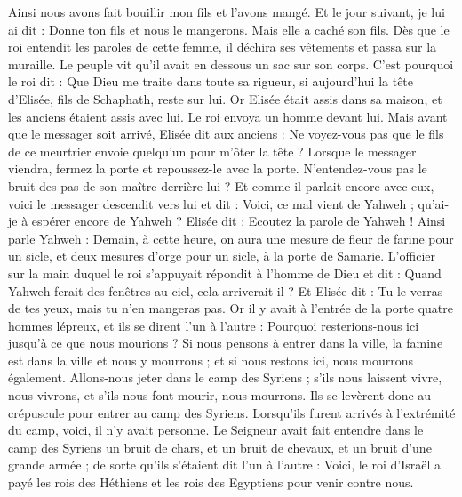 \begin{multicols}{2}
Ainsi nous avons fait bouillir mon fils et l'avons mangé. Et le jour suivant, je lui ai dit : Donne ton fils et nous le mangerons. Mais elle a caché son fils.
Dès que le roi entendit les paroles de cette femme, il déchira ses vêtements et passa sur la muraille. Le peuple vit qu'il avait en dessous un sac sur son corps.
C'est pourquoi le roi dit : Que Dieu me traite dans toute sa rigueur, si aujourd'hui la tête d'Elisée, fils de Schaphath, reste sur lui.
Or Elisée était assis dans sa maison, et les anciens étaient assis avec lui. Le roi envoya un homme devant lui. Mais avant que le messager soit arrivé, Elisée dit aux anciens : Ne voyez-vous pas que le fils de ce meurtrier envoie quelqu'un pour m'ôter la tête ? Lorsque le messager viendra, fermez la porte et repoussez-le avec la porte. N'entendez-vous pas le bruit des pas de son maître derrière lui ?
Et comme il parlait encore avec eux, voici le messager descendit vers lui et dit : Voici, ce mal vient de Yahweh ; qu'ai-je à espérer encore de Yahweh ?
\VerseOne{}Elisée dit : Ecoutez la parole de Yahweh ! Ainsi parle Yahweh : Demain, à cette heure, on aura une mesure de fleur de farine pour un sicle, et deux mesures d'orge pour un sicle, à la porte de Samarie.
L'officier sur la main duquel le roi s'appuyait répondit à l'homme de Dieu et dit : Quand Yahweh ferait des fenêtres au ciel, cela arriverait-il ? Et Elisée dit : Tu le verras de tes yeux, mais tu n'en mangeras pas.
Or il y avait à l'entrée de la porte quatre hommes lépreux, et ils se dirent l'un à l'autre : Pourquoi resterions-nous ici jusqu'à ce que nous mourions ?
Si nous pensons à entrer dans la ville, la famine est dans la ville et nous y mourrons ; et si nous restons ici, nous mourrons également. Allons-nous jeter dans le camp des Syriens ; s'ils nous laissent vivre, nous vivrons, et s'ils nous font mourir, nous mourrons.
Ils se levèrent donc au crépuscule pour entrer au camp des Syriens. Lorsqu'ils furent arrivés à l'extrémité du camp, voici, il n'y avait personne.
Le Seigneur avait fait entendre dans le camp des Syriens un bruit de chars, et un bruit de chevaux, et un bruit d'une grande armée ; de sorte qu'ils s'étaient dit l'un à l'autre : Voici, le roi d'Israël a payé les rois des Héthiens et les rois des Egyptiens pour venir contre nous.

\end{multicols}
